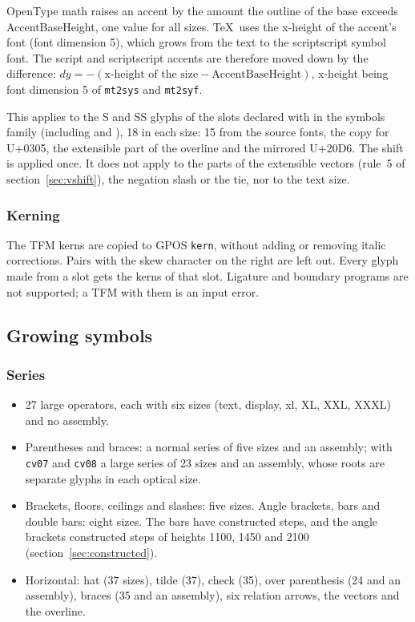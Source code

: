 \documentclass[10pt]{article}
\newcommand\file[1]{\texttt{#1}}
\newcommand\code[1]{\texttt{#1}}
\newcommand\feat[1]{\texttt{#1}}
\newcommand\U[1]{U+#1}
\begin{document}
OpenType math raises an accent by the amount the outline of the base
exceeds AccentBaseHeight, one value for all sizes.  \TeX\ uses the
x-height of the accent's font (font dimension 5), which grows from the
text to the scriptscript symbol font.  The script and scriptscript
accents are therefore moved down by the difference:
$dy = -(\text{x-height of the size} - \mathrm{AccentBaseHeight})$,
x-height being font dimension 5 of \file{mt2sys} and \file{mt2syf}.

This applies to the S and SS glyphs of the slots declared with
\code{\string\DeclareMathAccent} in the symbols family (including
\code{\string\wbar} and \code{\string\wwbar}), 18 in each size: 15 from
the source fonts, the copy for \U{0305}, the extensible part of the
overline and the mirrored \U{20D6}.  The shift is applied once.  It does
not apply to the parts of the extensible vectors (rule~5 of
section~\ref{sec:vshift}), the negation slash or the tie, nor to the
text size.

\subsubsection{Kerning}

The TFM kerns are copied to GPOS \feat{kern}, without adding or
removing italic corrections.  Pairs with the skew character on the
right are left out.  Every glyph made from a slot gets the kerns of that
slot.  Ligature and boundary programs are not supported; a TFM with
them is an input error.

\subsection{Growing symbols}\label{app:growing}
\subsubsection{Series}

\begin{itemize}
\item 27 large operators, each with six sizes (text, display, xl, XL,
  XXL, XXXL) and no assembly.
\item Parentheses and braces: a normal series of five sizes and an
  assembly; with \feat{cv07} and \feat{cv08} a large series of 23 sizes
  and an assembly, whose roots are separate glyphs in each optical
  size.
\item Brackets, floors, ceilings and slashes: five sizes.  Angle
  brackets, bars and double bars: eight sizes.  The bars have
  constructed steps, and the angle brackets constructed steps of
  heights 1100, 1450 and 2100 (section~\ref{sec:constructed}).
\item Horizontal: hat (37 sizes), tilde (37), check (35), over
  parenthesis (24 and an assembly), braces (35 and an assembly), six
  relation arrows, the vectors and the overline.
\end{itemize}
\end{document}
